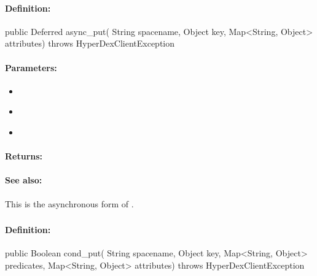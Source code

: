 \paragraph{Definition:}
\begin{javacode}
public Deferred async_put(
        String spacename,
        Object key,
        Map<String, Object> attributes) throws HyperDexClientException
\end{javacode}

\paragraph{Parameters:}
\begin{itemize}[noitemsep]
\item {}\\

\item {}\\

\item {}\\

\end{itemize}

\paragraph{Returns:}


\paragraph{See also:}  This is the asynchronous form of .

\pagebreak
\subsubsection{}
\label{api:java:cond_put}


\paragraph{Definition:}
\begin{javacode}
public Boolean cond_put(
        String spacename,
        Object key,
        Map<String, Object> predicates,
        Map<String, Object> attributes) throws HyperDexClientException
\end{javacode}


